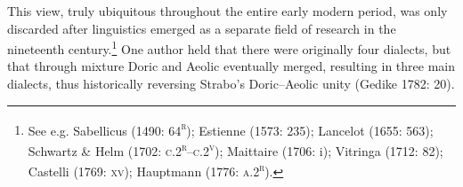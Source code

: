 \begin{styleStandard}
This view, truly ubiquitous throughout the entire early modern period, was only discarded after linguistics emerged as a separate field of research in the nineteenth century.\footnote{ See e.g. Sabellicus (1490: 64\textsc{\textsuperscript{r}}); Estienne (1573: 235); Lancelot (1655: 563); Schwartz \& Helm (1702: \textsc{c.2}\textsc{\textsuperscript{r}}–\textsc{c.2}\textsc{\textsuperscript{v}}); Maittaire (1706: i); Vitringa (1712: 82); Castelli (1769: \textsc{xv}); Hauptmann (1776: \textsc{a.2}\textsc{\textsuperscript{r}}).} One author held that there were originally four dialects, but that through mixture Doric and Aeolic eventually merged, resulting in three main dialects, thus historically reversing Strabo’s Doric–Aeolic unity (Gedike 1782: 20).
\end{styleStandard}

